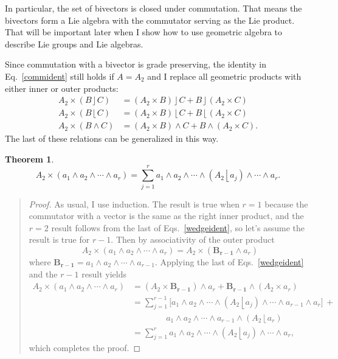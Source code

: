 \documentclass{utarticle}
\newcommand{\bl}[1]{\ensuremath{\bm{#1}}}
\DeclareMathOperator{\lin}{\rfloor}
\DeclareMathOperator{\rin}{\lfloor}
\DeclareMathOperator{\out}{\wedge}
\newcommand{\commute}[2]{\ensuremath{#1 \times #2}}
\newtheorem{thm}{Theorem}
\newcommand{\bp}{\begin{quotation} \begin{proof}}
\newcommand{\ep}{\end{proof} \end{quotation}}
\begin{document}
In particular, the set of bivectors is closed under commutation.  That means 
the bivectors form a Lie algebra with the commutator serving as the Lie product.  
That will be important later when I show how to use geometric algebra to describe
Lie groups and Lie algebras.

Since commutation with a bivector is grade preserving, the identity in
Eq.~\eqref{commident} still holds if $A=A_2$ and I replace all
geometric products with either inner or outer products:
\begin{align}
\commute{A_2}{(B \lin C)} & = (\commute{A_2}{B}) \lin C + B \lin (\commute{A_2}{C}) \nonumber \\
\commute{A_2}{(B \rin C)} & = (\commute{A_2}{B}) \rin C + B \rin (\commute{A_2}{C}) \nonumber \\ 
\commute{A_2}{(B \out C)} & = (\commute{A_2}{B}) \out C + B \out (\commute{A_2}{C}).
\label{wedgeident}
\end{align}
The last of these relations can be generalized in this way.
\begin{thm}
\begin{equation}
\commute{A_2}{(a_1 \out a_2 \out \dotsb \out a_r)} = \sum_{j=1}^r a_1 
    \out a_2 \out \dotsb \out (A_2 \rin a_j) \out \dotsb \out a_r.
\label{biveccommblade}
\end{equation}
\end{thm}
\bp
As usual, I use induction.  The result is true when $r=1$
because the commutator with a vector is the same as the right inner product,
and the $r=2$ result follows from the last of Eqs.~\eqref{wedgeident}, so let's 
assume the result is true for $r-1$.  Then by associativity of the outer product
\begin{equation}
\commute{A_2}{(a_1 \out a_2 \out \dotsb \out a_r)} = 
\commute{A_2}{(\bl{B_{r-1}} \out a_r)}
\end{equation}
where $\bl{B_{r-1}} = a_1 \out a_2 \out \dotsb \out a_{r-1}$.  Applying the
last of Eqs.~\eqref{wedgeident} and the $r-1$ result yields
\begin{align} 
\commute{A_2}{(a_1 \out a_2 \out \dotsb \out a_r)}
 & = (\commute{A_2}{\bl{B_{r-1}}}) \out a_r +  \bl{B_{r-1}} \out (\commute{A_2}{a_r}) \nonumber \\
 & = \sum_{j=1}^{r-1} \big[a_1 \out a_2 \out \dotsb \out (A_2 \rin a_j) 
     \out \dotsb \out a_{r-1} \out a_r\big] \, + \nonumber \\
 & \qquad \qquad a_1 \out a_2 \out \dotsb \out a_{r-1} \out 
     (A_2 \rin a_r) \nonumber \\
 & = \sum_{j=1}^r a_1 \out a_2 \out \dotsb \out (A_2 \rin a_j) \out \dotsb 
     \out a_r,
\end{align}
which completes the proof.
\ep
\end{document}
